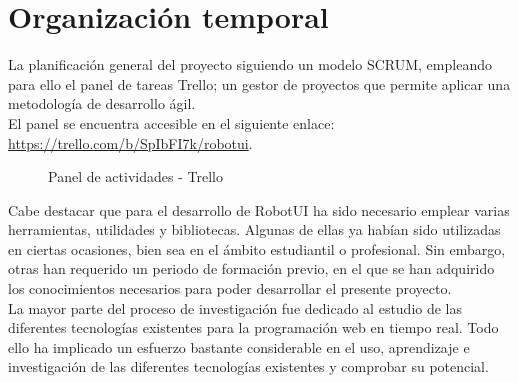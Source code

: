 

\newpage


\chapter{Organización temporal}
\label{chap:planificación}

La planificación general del proyecto siguiendo un modelo SCRUM, empleando para ello el panel de tareas Trello; un gestor de proyectos que permite aplicar una metodología de desarrollo ágil.\\

El panel se encuentra accesible en el siguiente enlace: \url{https://trello.com/b/SpIbFI7k/robotui}.

\begin{figure}[H]
\caption{Panel de actividades - Trello}
\end{figure}


Cabe destacar que para el desarrollo de RobotUI ha sido necesario emplear varias herramientas, utilidades y bibliotecas. Algunas de ellas ya habían sido utilizadas en ciertas ocasiones, bien sea en el ámbito estudiantil o profesional. 
Sin embargo, otras han requerido un periodo de formación previo, en el que se han adquirido los conocimientos necesarios para poder desarrollar el presente proyecto.\\

La mayor parte del proceso de investigación fue dedicado al estudio de las diferentes tecnologías existentes para la programación web en tiempo real. Todo ello ha implicado un esfuerzo bastante considerable en el uso, 
aprendizaje e investigación de las diferentes tecnologías existentes y comprobar su potencial.\\

